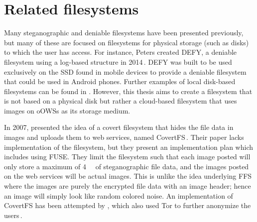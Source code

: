 \section{Related filesystems}
\label{sec:rel_fs}
Many steganographic and deniable filesystems have been presented previously, but many of these are focused on filesystems for physical storage (such as disks) to which the user has access. For instance, Peters \etal created DEFY, a deniable filesystem using a \mbox{log-based} structure in 2014\,\cite{petersDEFYDeniableFile2014}. DEFY was built to be used exclusively on the \gls{SSD} found in mobile devices to provide a deniable filesystem that could be used in Android phones. Further examples of local \mbox{disk-based} filesystems can be found in \cite{andersonSteganographicFileSystem1998, mcdonaldStegFSSteganographicFile2000, domingo-ferrerSharedSteganographicFile2008, hanMultiuserSteganographicFile2010}. However, this thesis aims to create a filesystem that is not based on a physical disk but rather a \mbox{cloud-based} filesystem that uses images on o\glspl{OWS} as its storage medium. 

In 2007, \citeauthor{baliga2007web} presented the idea of a covert filesystem that hides the file data in images and uploads them to web services, named CovertFS\,\cite{baliga2007web}. Their paper lacks implementation of the filesystem, but they present an implementation plan which includes using \gls{FUSE}. They limit the filesystem such that each image posted will only store a maximum of \SI{4}{\kilo\byte} of steganographic file data, and the images posted on the web services will be actual images. This is unlike the idea underlying \gls{FFS} where the images are purely the encrypted file data with an image header; hence an image will simply look like random colored noise. An implementation of CovertFS has been attempted by \citeauthor{sosaSuperSecretFile2007}, which also used Tor to further anonymize the users\,\cite{sosaSuperSecretFile2007}.


